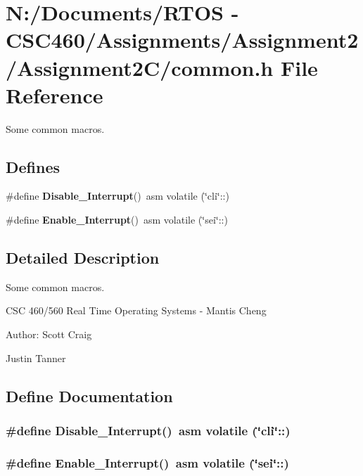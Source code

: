 \section{N:/Documents/RTOS - CSC460/Assignments/Assignment2/Assignment2C/common.h File Reference}
\label{common_8h}
Some common macros. 

\subsection*{Defines}
\begin{CompactItemize}
\item 
\#define {\bf Disable\_\-Interrupt}()~asm volatile (\char`\"{}cli\char`\"{}::)
\item 
\#define {\bf Enable\_\-Interrupt}()~asm volatile (\char`\"{}sei\char`\"{}::)
\end{CompactItemize}


\subsection{Detailed Description}
Some common macros. 

CSC 460/560 Real Time Operating Systems - Mantis Cheng

\begin{Desc}
\item[Author:]Scott Craig 

Justin Tanner \end{Desc}


\subsection{Define Documentation}
\subsubsection{\setlength{\rightskip}{0pt plus 5cm}\#define Disable\_\-Interrupt()~asm volatile (\char`\"{}cli\char`\"{}::)}\label{common_8h_f191103ba7b5db1d681e028e0120f352}


\subsubsection{\setlength{\rightskip}{0pt plus 5cm}\#define Enable\_\-Interrupt()~asm volatile (\char`\"{}sei\char`\"{}::)}\label{common_8h_8b76c3db3d5ee084c90ff0225cd746a6}


